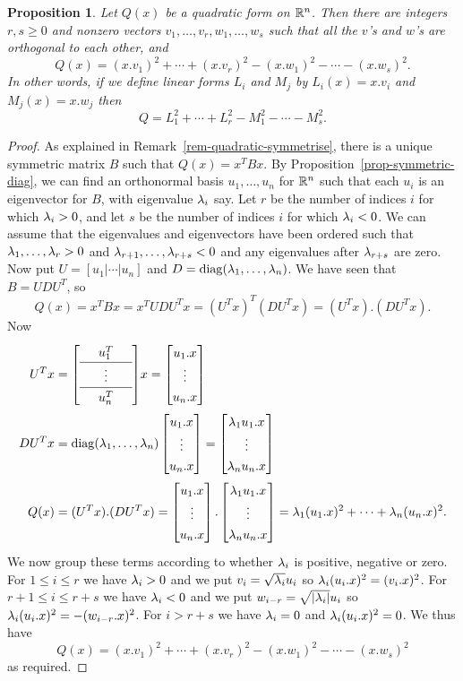\documentclass[reqno]{amsart}
\newtheorem{proposition}[theorem]{Proposition}
\theoremstyle{definition}
\begin{document}
\begin{proposition}\label{prop-quadratic-diag}
 Let $Q(x)$ be a quadratic form on ${\mathbb{R}}^n$.  Then there are integers
 $r,s\geq 0$ and nonzero vectors $v_1,\dotsc,v_r,w_1,\dotsc,w_s$ such
 that all the $v$'s and $w$'s are orthogonal to each other, and
 \[ Q(x) = (x.v_1)^2 + \dotsb + (x.v_r)^2 
           - (x.w_1)^2 - \dotsb - (x.w_s)^2.
 \]
 In other words, if we define linear forms $L_i$ and $M_j$ by
 $L_i(x)=x.v_i$ and $M_j(x)=x.w_j$ then 
 \[ Q = L_1^2 + \dotsb + L_r^2 - M_1^2 - \dotsb - M_s^2. \]
\end{proposition}
\begin{proof}
 As explained in Remark~\ref{rem-quadratic-symmetrise}, there is a
 unique symmetric matrix $B$ such that $Q(x)=x^TBx$.  By
 Proposition~\ref{prop-symmetric-diag}, we can find an orthonormal
 basis $u_1,\dotsc,u_n$ for ${\mathbb{R}}^n$ such that each $u_i$ is an
 eigenvector for $B$, with eigenvalue $\lambda_i$ say.  Let $r$ be the
 number of indices $i$ for which $\lambda_i>0$, and let $s$ be the number
 of indices $i$ for which $\lambda_i<0$.  We can assume that the
 eigenvalues and eigenvectors have been ordered such that
 $\lambda_1,\dotsc,\lambda_r>0$ and $\lambda_{r+1},\dotsc,\lambda_{r+s}<0$ and any
 eigenvalues after $\lambda_{r+s}$ are zero.  Now put
 $U=[u_1|\dotsb|u_n]$ and $D=\operatorname{diag}(\lambda_1,\dotsc,\lambda_n)$.  We have seen
 that $B=UDU^T$, so 
 \[ Q(x)=x^TBx=x^TUDU^Tx = (U^Tx)^T (DU^Tx) = (U^Tx).(DU^Tx). \]
 Now 
 \begin{align*}
  U^Tx &= {\renewcommand{\arraystretch}{1.3}
   \left[\begin{array}{ccc}
    & u_1^T & \\ \hline
    & \vdots & \\ \hline
    & u_n^T & 
   \end{array}\right]}
   x 
   = \bbm u_1.x \\ \vdots \\ u_n.x \ebm \\
  DU^Tx &= 
   \diag(\lm_1,\dotsc,\lm_n) 
   \bbm u_1.x \\ \vdots \\ u_n.x \ebm 
   = 
   \bbm \lm_1 u_1.x \\ \vdots \\ \lm_n u_n.x \ebm \\
  Q(x) &= (U^Tx).(DU^Tx) = 
   \bbm u_1.x \\ \vdots \\ u_n.x \ebm . 
   \bbm \lm_1 u_1.x \\ \vdots \\ \lm_n u_n.x \ebm =
   \lm_1(u_1.x)^2 + \dotsb + \lm_n(u_n.x)^2.
 \end{align*}
 We now group these terms according to whether $\lambda_i$ is positive,
 negative or zero.  For $1\leq i\leq r$ we have $\lambda_i>0$ and we put
 $v_i=\sqrt{\lambda_i}u_i$ so $\lambda_i(u_i.x)^2=(v_i.x)^2$.  For
 $r+1\leq i\leq r+s$ we have $\lambda_i<0$ and we put
 $w_{i-r}=\sqrt{|\lambda_i|}u_i$ so $\lambda_i(u_i.x)^2=-(w_{i-r}.x)^2$.  For
 $i>r+s$ we have $\lambda_i=0$ and $\lambda_i(u_i.x)^2=0$.  We thus have
 \[ Q(x) = (x.v_1)^2 + \dotsb + (x.v_r)^2 
           - (x.w_1)^2 - \dotsb - (x.w_s)^2
 \]
 as required.
\end{proof}
\end{document}
